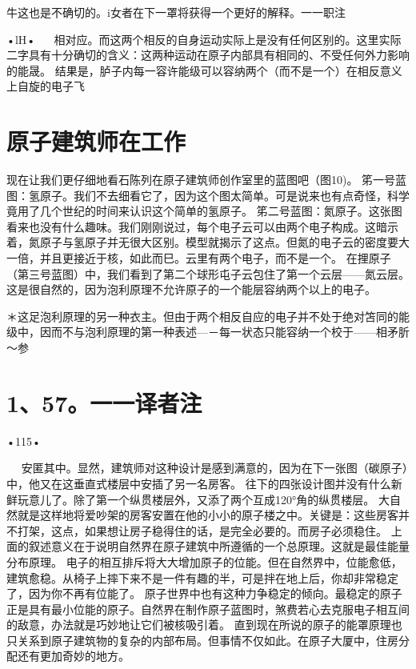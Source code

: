 牛这也是不确切的。i女者在下一罩将获得一个更好的解释。一一职注

•lH•
  
相对应。而这两个相反的自身运动实际上是没有任何区别的。这里实际二字具有十分确切的含义：这两种运动在原子内部具有相同的、不受任何外力影响的能晟。
结果是，胪子内每一容许能级可以容纳两个（而不是一个）在相反意义上自旋的电子飞

\section{原子建筑师在工作}

现在让我们更仔细地看石陈列在原子建筑师创作室里的蓝图吧（图10)。
笫一号蓝图：氢原子。我们不去细看它了，因为这个图太简单。可是说来也有点奇怪，科学竟用了几个世纪的时间来认识这个简单的氢原子。
笫二号蓝图：氮原子。这张图看来也没有什么趣味。我们刚刚说过，每个电子云可以由两个电子构成。这暗示着，氮原子与氢原子并无很大区别。模型就揭示了这点。但氮的电子云的密度要大一倍，并且更接近于核，如此而巳。云里有两个电子，而不是一个。
在捚原子（第三号蓝图）中，我们看到了第二个球形屯子云包住了第一个云层——氮云层。这是很自然的，因为泡利原理不允许原子的一个能层容纳两个以上的电子。

＊这足泡利原理的另一种衣主。但由于两个相反自应的电子并不处于绝对笘同的能级中，因而不与泡利原理的第一种表述—－每一状态只能容纳一个校于——相矛肵～参\section{1、57。一一译者注}

•115•
  







  
安匿其中。显然，建筑师对这种设计是感到满意的，因为在下一张图（碳原子）中，他又在这垂直式楼层中安插了另一名房客。
往下的四张设计图并没有什么新鲜玩意儿了。除了第一个纵贯楼层外，又添了两个互成120°角的纵贯楼层。
大自然就是这样地将爱吵架的房客安置在他的小小的原子楼之中。关键是：这些房客并不打架，这点，如果想让房子稳得住的话，是完全必要的。而房子必须稳住。
上面的叙述意义在于说明自然界在原子建筑中所遵循的一个总原理。这就是最佳能量分布原理。
电子的相互排斥将大大增加原子的位能。但在自然界中，位能愈低，建筑愈稳。从椅子上摔下来不是一件有趣的半，可是拌在地上后，你却非常稳定了，因为你不再有位能了。
原子世界中也有这种力争稳定的倾向。最稳定的原子正是具有最小位能的原子。自然界在制作原子蓝图时，煞费若心去克服电子相互间的敌意，办法就是巧妙地让它们被核吸引着。
直到现在所说的原子的能罩原理也只关系到原子建筑物的复杂的内部布局。但事情不仅如此。在原子大厦中，住房分配还有更加奇妙的地方。

